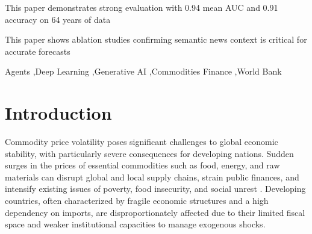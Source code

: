 \documentclass[12pt]{elsarticle}
\begin{document}
\begin{frontmatter}
\begin{highlights}
\item This paper demonstrates strong evaluation with 0.94 mean AUC  and 0.91 accuracy on 64 years of data

\item This paper shows ablation studies confirming semantic news context is critical for accurate forecasts 

\end{highlights}

\begin{keyword}
Agents \sep Deep Learning \sep Generative AI \sep Commodities Finance \sep World Bank




\end{keyword}

\end{frontmatter}


\section{Introduction}
\label{sec:intro}
Commodity price volatility poses significant challenges to global economic stability, with particularly severe consequences for developing nations. Sudden surges in the prices of essential commodities such as food, energy, and raw materials can disrupt global and local supply chains, strain public finances, and intensify existing issues of poverty, food insecurity, and social unrest \cite{wheeler2020adding}. Developing countries, often characterized by fragile economic structures and a high dependency on imports, are disproportionately affected due to their limited fiscal space and weaker institutional capacities  \cite{de2010agricultural} to manage exogenous shocks.
\end{document}
